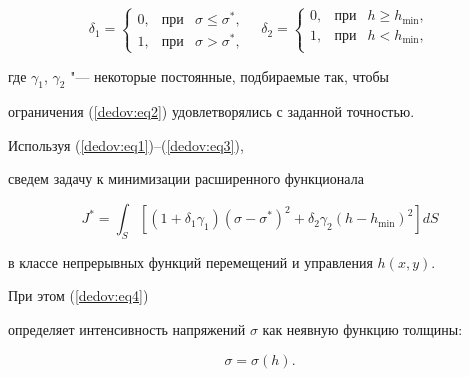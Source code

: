 \begin{equation}

\label{dedov:eq3}

\delta _1 =\left\{ \begin{array}{lll}

 0,& \text{при}  & \sigma \leqslant \sigma ^\ast , \\

 1,& \text{при}  &  \sigma >\sigma ^\ast ,

 \end{array} \right.

\quad

\delta _2 =\left\{ \begin{array}{lll}

 0, & \text{при}  &  h\geqslant h_{\min } , \\

 1,& \text{при}  &  h<h_{\min } , \\

 \end{array} \right.

\end{equation}

где $\gamma _1$, $\gamma _2 $ "--- некоторые постоянные, подбираемые так, чтобы

ограничения (\ref{dedov:eq2}) удовлетворялись с заданной точностью.

Используя (\ref{dedov:eq1})--(\ref{dedov:eq3}),

сведем задачу к минимизации расширенного функционала

\begin{equation}

\label{dedov:eq4}

J^\ast =\int_S \left[ \left( 1+\delta _1 \gamma _1  \right)\left( \sigma  -\sigma ^\ast  \right)^2+\delta _2 \gamma _2 \left(

h-h_{\min }  \right)^2 \right] dS

\end{equation}

в классе непрерывных функций перемещений и управления $h(x, y)$.

При этом (\ref{dedov:eq4})

определяет интенсивность напряжений $\sigma $ как неявную функцию толщины:

\begin{equation}

\label{dedov:eq5}

\sigma =\sigma (h).

\end{equation}



